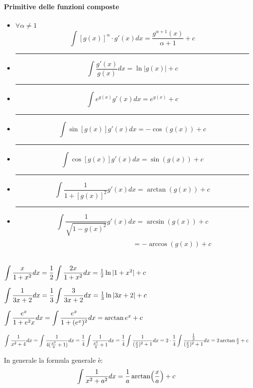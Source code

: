 \documentclass[12pt]{report}
\newcounter{exercise}
\begin{document}
			\paragraph{Primitive delle funzioni composte}
			\begin{itemize}
				\item $\forall \alpha \neq 1$
				\[
				\int [g(x)]^\alpha \cdot g'(x)dx = \frac{g^{\alpha + 1}(x)}{\alpha + 1} + c
				\]
				\par\noindent\rule{\linewidth}{0.5pt}\par
				\item \[
				\int \frac{g'(x)}{g(x)}dx = \ln|g(x)| + c
				\]
				\par\noindent\rule{\linewidth}{0.5pt}\par
				\item \[
				\int e^{g(x)}g'(x)dx=e^{g(x)} + c
				\]
				\par\noindent\rule{\linewidth}{0.5pt}\par
				\item \[
				\int \sin[g(x)] g'(x)dx = -\cos(g(x)) +c
				\]
				\par\noindent\rule{\linewidth}{0.5pt}\par
				\item \[
				\int \cos[g(x)]g'(x)dx = \sin (g(x)) + c
				\]
				\par\noindent\rule{\linewidth}{0.5pt}\par
				\item \[
				\int \frac{1}{1 + [g(x)]^2}g'(x)dx = \arctan(g(x)) + c
				\]
				\par\noindent\rule{\linewidth}{0.5pt}\par
				\item \[
				\int \frac{1}{\sqrt{1 - g(x)^2}}g'(x)dx =\arcsin (g(x)) + c
				\]
				\[
				\phantom{\int \frac{1}{\sqrt{1 - g(x)^2}}g'(x)dx} = -\arccos(g(x))+c
				\]
			\end{itemize}
			\begin{exercise}{}{}
				$\mathlarger{\int \frac{x}{1 + x^2}dx} = \mathlarger{\frac{1}{2}\int \frac{2x}{1 + x^2}dx} = \frac{1}{2}\ln|1 + x^2| + c$
			\end{exercise}
			\begin{exercise}{}{}
				$\mathlarger{\int \frac{1}{3x + 2}dx = \frac{1}{3}\int \frac{3}{3x + 2}dx} = \frac{1}{3}\ln|3x + 2| + c$
			\end{exercise}
			\begin{exercise}{}{}
				$\mathlarger{\int \frac{e^x}{1 + e^2x}dx = \int \frac{e^x}{1 + (e^x)^2}dx} = \arctan e^x + c$
			\end{exercise}
			\begin{exercise}{}{}
				$\mathlarger{\int \frac{1}{x^2+4}dx = \int \frac{1}{4(\frac{x^2}{4} + 1)}dx = \frac{1}{4}\int \frac{1}{\frac{x^2}{4} + 1}dx = \frac{1}{4} \int \frac{1}{(\frac{x}{2})^2 + 1}dx = 2\cdot \frac{1}{4} \int \frac{\frac{1}{2}}{(\frac{x}{2})^2 + 1}dx} = 2\arctan \frac{x}{2} + c$
			\end{exercise}
			\begin{note}{}{}
				In generale la formula generale è:
				\[
				\int \frac{1}{x^2 + a^2}dx = \frac{1}{a}\arctan\Bigl(\frac{x}{a}\Bigr) + c
				\]
			\end{note}
\end{document}
